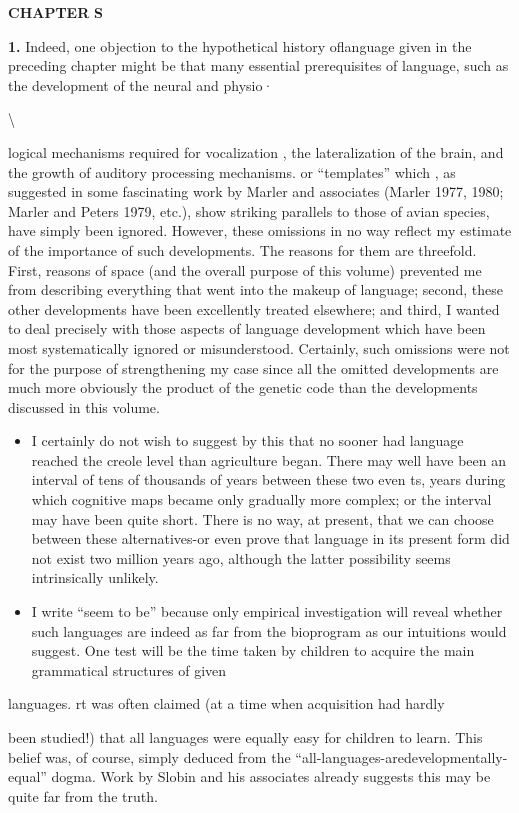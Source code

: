 \textbf{CHAPTER} \textbf{S}

\textbf{1.} Indeed, one objection to the hypothetical history oflanguage given in the preceding chapter might be that many essential prerequi\-sites of language, such as the development of the neural and physio·

{\textbackslash}


logical mechanisms required for vocalization , the lateralization of the brain, and the growth of auditory processing mechanisms. or ``tem\-plates'' which , as suggested in some fascinating work by Marler and associates (Marler 1977, 1980; Marler and Peters 1979, etc.), show striking parallels to those of avian species, have simply been ignored. However, these omissions in no way reflect my estimate of the impor\-tance of such developments. The reasons for them are threefold. First, reasons of space (and the overall purpose of this volume) pre\-vented me from describing everything that went into the makeup of language; second, these other developments have been excellently treated elsewhere; and third, I wanted to deal precisely with those aspects of language development which have been most systematically ignored or misunderstood. Certainly, such omissions were not for the purpose of strengthening my case since all the omitted developments are much more obviously the product of the genetic code than the developments discussed in this volume.

\begin{itemize}
\item I certainly do not wish to suggest by this that no sooner had language reached the creole level than agriculture began. There may well have been an interval of tens of thousands of years between these two even ts, years during which cognitive maps became only gradually more complex; or the interval may have been quite short. There is no way, at present, that we can choose between these alternatives-or even prove that language in its present form did not exist two million years ago, although the latter possibility seems intrinsically unlikely.
\item I write ``seem to be'' because only empirical investigation will reveal whether such languages are indeed as far from the bio\-program as our intuitions would suggest. One test will be the time taken by children to acquire the main grammatical structures of given
\end{itemize}

languages. rt was often claimed (at a time when acquisition had hardly

been studied!) that all languages were equally easy for children to learn. This belief was, of course, simply deduced from the ``all-languages-are\-developmentally-equal'' dogma. Work by Slobin and his associates already suggests this may be quite far from the truth.





  


  
 
